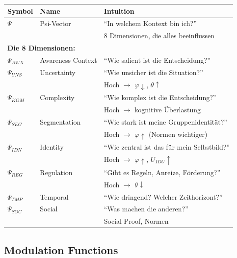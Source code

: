 \begin{longtable}{p{2cm}p{4cm}p{7cm}}
\toprule
\textbf{Symbol} & \textbf{Name} & \textbf{Intuition} \\
\midrule
\endhead

$\Psi$ & Psi-Vector & 
``In welchem Kontext bin ich?'' \\
& & 8 Dimensionen, die alles beeinflussen \\[6pt]

\midrule
\multicolumn{3}{l}{\textbf{Die 8 Dimensionen:}} \\
\midrule

$\Psi_{AWX}$ & Awareness Context & 
``Wie salient ist die Entscheidung?'' \\[4pt]

$\Psi_{UNS}$ & Uncertainty & 
``Wie unsicher ist die Situation?'' \\
& & Hoch $\to$ $\varphi \downarrow$, $\theta \uparrow$ \\[4pt]

$\Psi_{KOM}$ & Complexity & 
``Wie komplex ist die Entscheidung?'' \\
& & Hoch $\to$ kognitive Überlastung \\[4pt]

$\Psi_{SEG}$ & Segmentation & 
``Wie stark ist meine Gruppenidentität?'' \\
& & Hoch $\to$ $\varphi \uparrow$ (Normen wichtiger) \\[4pt]

$\Psi_{IDN}$ & Identity & 
``Wie zentral ist das für mein Selbstbild?'' \\
& & Hoch $\to$ $\varphi \uparrow$, $U_{IDU} \uparrow$ \\[4pt]

$\Psi_{REG}$ & Regulation & 
``Gibt es Regeln, Anreize, Förderung?'' \\
& & Hoch $\to$ $\theta \downarrow$ \\[4pt]

$\Psi_{TMP}$ & Temporal & 
``Wie dringend? Welcher Zeithorizont?'' \\[4pt]

$\Psi_{SOC}$ & Social & 
``Was machen die anderen?'' \\
& & Social Proof, Normen \\[4pt]

\bottomrule
\end{longtable}

\subsection{Modulation Functions}

